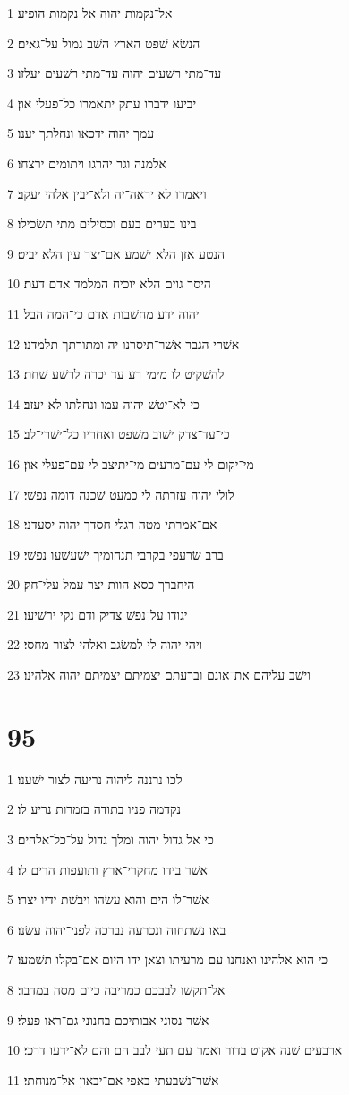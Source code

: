 \par 1 אל־נקמות יהוה אל נקמות הופיע׃
\par 2 הנשׂא שׁפט הארץ השׁב גמול על־גאים׃
\par 3 עד־מתי רשׁעים יהוה עד־מתי רשׁעים יעלזו׃
\par 4 יביעו ידברו עתק יתאמרו כל־פעלי און׃
\par 5 עמך יהוה ידכאו ונחלתך יענו׃
\par 6 אלמנה וגר יהרגו ויתומים ירצחו׃
\par 7 ויאמרו לא יראה־יה ולא־יבין אלהי יעקב׃
\par 8 בינו בערים בעם וכסילים מתי תשׂכילו׃
\par 9 הנטע אזן הלא ישׁמע אם־יצר עין הלא יביט׃
\par 10 היסר גוים הלא יוכיח המלמד אדם דעת׃
\par 11 יהוה ידע מחשׁבות אדם כי־המה הבל׃
\par 12 אשׁרי הגבר אשׁר־תיסרנו יה ומתורתך תלמדנו׃
\par 13 להשׁקיט לו מימי רע עד יכרה לרשׁע שׁחת׃
\par 14 כי לא־יטשׁ יהוה עמו ונחלתו לא יעזב׃
\par 15 כי־עד־צדק ישׁוב משׁפט ואחריו כל־ישׁרי־לב׃
\par 16 מי־יקום לי עם־מרעים מי־יתיצב לי עם־פעלי און׃
\par 17 לולי יהוה עזרתה לי כמעט שׁכנה דומה נפשׁי׃
\par 18 אם־אמרתי מטה רגלי חסדך יהוה יסעדני׃
\par 19 ברב שׂרעפי בקרבי תנחומיך ישׁעשׁעו נפשׁי׃
\par 20 היחברך כסא הוות יצר עמל עלי־חק׃
\par 21 יגודו על־נפשׁ צדיק ודם נקי ירשׁיעו׃
\par 22 ויהי יהוה לי למשׂגב ואלהי לצור מחסי׃
\par 23 וישׁב עליהם את־אונם וברעתם יצמיתם יצמיתם יהוה אלהינו׃

\chapter{95}

\par 1 לכו נרננה ליהוה נריעה לצור ישׁענו׃
\par 2 נקדמה פניו בתודה בזמרות נריע לו׃
\par 3 כי אל גדול יהוה ומלך גדול על־כל־אלהים׃
\par 4 אשׁר בידו מחקרי־ארץ ותועפות הרים לו׃
\par 5 אשׁר־לו הים והוא עשׂהו ויבשׁת ידיו יצרו׃
\par 6 באו נשׁתחוה ונכרעה נברכה לפני־יהוה עשׂנו׃
\par 7 כי הוא אלהינו ואנחנו עם מרעיתו וצאן ידו היום אם־בקלו תשׁמעו׃
\par 8 אל־תקשׁו לבבכם כמריבה כיום מסה במדבר׃
\par 9 אשׁר נסוני אבותיכם בחנוני גם־ראו פעלי׃
\par 10 ארבעים שׁנה אקוט בדור ואמר עם תעי לבב הם והם לא־ידעו דרכי׃
\par 11 אשׁר־נשׁבעתי באפי אם־יבאון אל־מנוחתי׃


